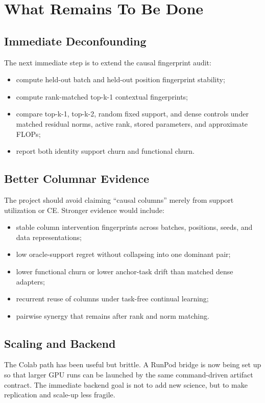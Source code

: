 \documentclass[11pt]{article}
\begin{document}
\section{What Remains To Be Done}

\subsection{Immediate Deconfounding}

The next immediate step is to extend the causal fingerprint audit:
\begin{itemize}
  \item compute held-out batch and held-out position fingerprint stability;
  \item compute rank-matched top-k-1 contextual fingerprints;
  \item compare top-k-1, top-k-2, random fixed support, and dense controls under
  matched residual norms, active rank, stored parameters, and approximate
  FLOPs;
  \item report both identity support churn and functional churn.
\end{itemize}

\subsection{Better Columnar Evidence}

The project should avoid claiming ``causal columns'' merely from support
utilization or CE. Stronger evidence would include:
\begin{itemize}
  \item stable column intervention fingerprints across batches, positions,
  seeds, and data representations;
  \item low oracle-support regret without collapsing into one dominant pair;
  \item lower functional churn or lower anchor-task drift than matched dense
  adapters;
  \item recurrent reuse of columns under task-free continual learning;
  \item pairwise synergy that remains after rank and norm matching.
\end{itemize}

\subsection{Scaling and Backend}

The Colab path has been useful but brittle. A RunPod bridge is now being set up
so that larger GPU runs can be launched by the same command-driven artifact
contract. The immediate backend goal is not to add new science, but to make
replication and scale-up less fragile.
\end{document}
